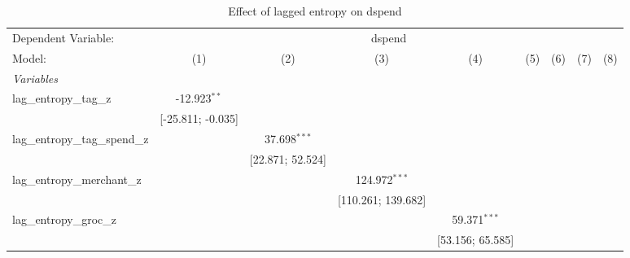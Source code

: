 
\begin{table}[htbp]
   \centering
   \tiny
   \begin{threeparttable}[b]
      \caption{\label{tab:reg_dspend_lagged} Effect of lagged entropy on dspend}
      \begin{tabular}{lcccccccc}
         \tabularnewline \midrule \midrule
         Dependent Variable: & \multicolumn{8}{c}{dspend}\\
         Model:                           & (1)                & (2)                & (3)                & (4)                & (5)                 & (6)                  & (7)                  & (8)\\  
         \midrule
         \emph{Variables}\\
         lag\_entropy\_tag\_z             & -12.923$^{**}$     &                    &                    &                    &                     &                      &                      &   \\   
                                          & [-25.811; -0.035]  &                    &                    &                    &                     &                      &                      &   \\   
         lag\_entropy\_tag\_spend\_z      &                    & 37.698$^{***}$     &                    &                    &                     &                      &                      &   \\   
                                          &                    & [22.871; 52.524]   &                    &                    &                     &                      &                      &   \\   
         lag\_entropy\_merchant\_z        &                    &                    & 124.972$^{***}$    &                    &                     &                      &                      &   \\   
                                          &                    &                    & [110.261; 139.682] &                    &                     &                      &                      &   \\   
         lag\_entropy\_groc\_z            &                    &                    &                    & 59.371$^{***}$     &                     &                      &                      &   \\   
                                          &                    &                    &                    & [53.156; 65.585]   &                     &                      &                      &   \\   

\end{tabular}
\end{threeparttable}
\end{table}
